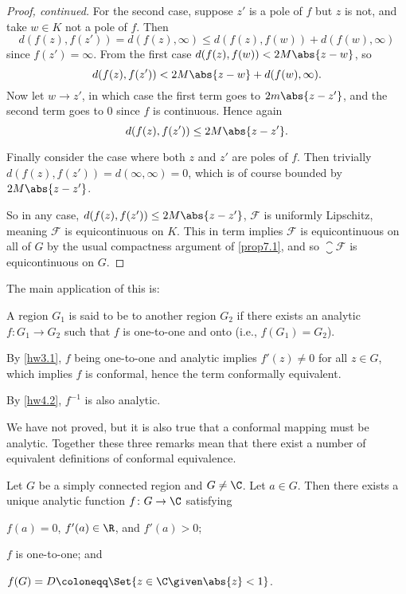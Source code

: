 \begin{proof}[Proof, continued]
	For the second case, suppose $z'$ is a pole of $f$ but $z$ is not, and take $w \in K$ not a pole of $f$.
	Then
	\[
		d(f(z), f(z')) = d(f(z), \infty) \leq d(f(z), f(w)) + d(f(w), \infty)
	\]
	since $f(z') = \infty$.
	From the first case $d(f(z), f(w)) < 2 M \abs{z - w}$, so
	\[
		d(f(z), f(z')) < 2 M \abs{z - w} + d(f(w), \infty).
	\]
	Now let $w \to z'$, in which case the first term goes to $2 m \abs{z - z'}$, and the second term goes to $0$ since $f$ is continuous.
	Hence again
	\[
		d(f(z), f(z')) \leq 2 M \abs{z - z'}.
	\]

	Finally consider the case where both $z$ and $z'$ are poles of $f$.
	Then trivially $d(f(z), f(z')) = d(\infty, \infty) = 0$, which is of course bounded by $2 M \abs{z - z'}$.

	So in any case, $d(f(z), f(z')) \leq 2 M \abs{z - z'}$, $\mathcal{F}$ is uniformly Lipschitz, meaning $\mathcal{F}$ is equicontinuous on $K$.
	This in term implies $\mathcal{F}$ is equicontinuous on all of $G$ by the usual compactness argument of \autoref{prop7.1}, and so $\closure{\mathcal{F}}$ is equicontinuous on $G$.
\end{proof}

The main application of this is:


\begin{definition}
	A region $G_1$ is said to be  to another region $G_2$ if there exists an analytic $f \colon G_1 \to G_2$ such that $f$ is one-to-one and onto (i.e., $f(G_1) = G_2$).
\end{definition}

\begin{remark}
	By \autoref{hw3.1}, $f$ being one-to-one and analytic implies $f'(z) \neq 0$ for all $z \in G$, which implies $f$ is conformal, hence the term conformally equivalent.

	By \autoref{hw4.2}, $f^{-1}$ is also analytic.

	We have not proved, but it is also true that a conformal mapping must be analytic.
	Together these three remarks mean that there exist a number of equivalent definitions of conformal equivalence.
\end{remark}

\begin{theorem}\label{thm7.17}
	Let $G$ be a simply connected region and $G \neq \C$.
	Let $a \in G$.
	Then there exists a unique analytic function $f \colon G \to \C$ satisfying
	\begin{items}
		\item\label{rmti} $f(a) = 0$, $f'(a) \in \R$, and $f'(a) > 0$;
		\item\label{rmtii} $f$ is one-to-one; and
		\item\label{rmtiii} $f(G) = D \coloneqq \Set{z \in \C \given \abs{z} < 1}$.
	\end{items}
\end{theorem}

